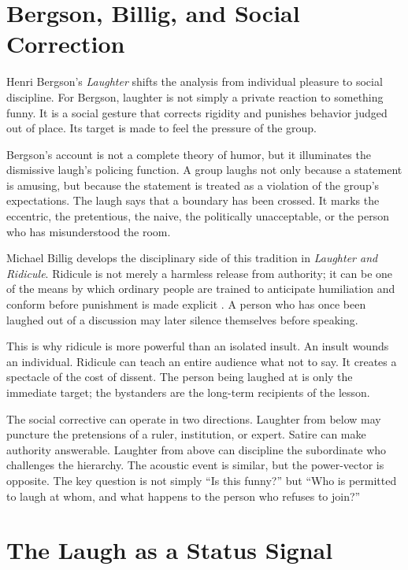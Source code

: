 ﻿\documentclass[12pt,a4paper]{book}
\begin{document}
\section{Bergson, Billig, and Social Correction}

Henri Bergson's \emph{Laughter} shifts the analysis from individual pleasure to social discipline. For Bergson, laughter is not simply a private reaction to something funny. It is a social gesture that corrects rigidity and punishes behavior judged out of place. Its target is made to feel the pressure of the group.

Bergson's account is not a complete theory of humor, but it illuminates the dismissive laugh's policing function. A group laughs not only because a statement is amusing, but because the statement is treated as a violation of the group's expectations. The laugh says that a boundary has been crossed. It marks the eccentric, the pretentious, the naive, the politically unacceptable, or the person who has misunderstood the room.

Michael Billig develops the disciplinary side of this tradition in \emph{Laughter and Ridicule}. Ridicule is not merely a harmless release from authority; it can be one of the means by which ordinary people are trained to anticipate humiliation and conform before punishment is made explicit \cite{billig2005}. A person who has once been laughed out of a discussion may later silence themselves before speaking.

This is why ridicule is more powerful than an isolated insult. An insult wounds an individual. Ridicule can teach an entire audience what not to say. It creates a spectacle of the cost of dissent. The person being laughed at is only the immediate target; the bystanders are the long-term recipients of the lesson.

The social corrective can operate in two directions. Laughter from below may puncture the pretensions of a ruler, institution, or expert. Satire can make authority answerable. Laughter from above can discipline the subordinate who challenges the hierarchy. The acoustic event is similar, but the power-vector is opposite. The key question is not simply ``Is this funny?'' but ``Who is permitted to laugh at whom, and what happens to the person who refuses to join?''

\section{The Laugh as a Status Signal}
\end{document}
